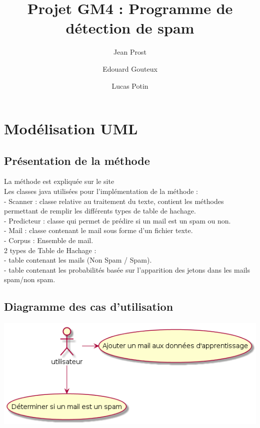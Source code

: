 \documentclass{article}
\title{Projet GM4 : Programme de détection de spam}
\author{Jean Prost \and Edouard Gouteux \and Lucas Potin}
\begin{document}
\maketitle
 
\section{Modélisation UML}

\subsection{Présentation de la méthode}

La méthode est expliquée sur le site\\

Les classes java utilisées pour l'implémentation de la méthode : \\
- Scanner : classe relative au traitement du texte, contient les méthodes permettant de remplir les différents types de table de hachage. \\
- Predicteur : classe qui permet de prédire si un mail est un spam ou non. \\
- Mail : classe contenant le mail sous forme d'un fichier texte.\\
- Corpus : Ensemble de mail. \\

2 types de Table de Hachage  :\\
- table contenant les mails (Non Spam / Spam).\\
- table contenant les probabilités basée sur l'apparition des jetons dans les mails spam/non spam.\\

\subsection{Diagramme des cas d'utilisation}

\includegraphics[scale=0.6]{diag_usecase.png}
\end{document}
